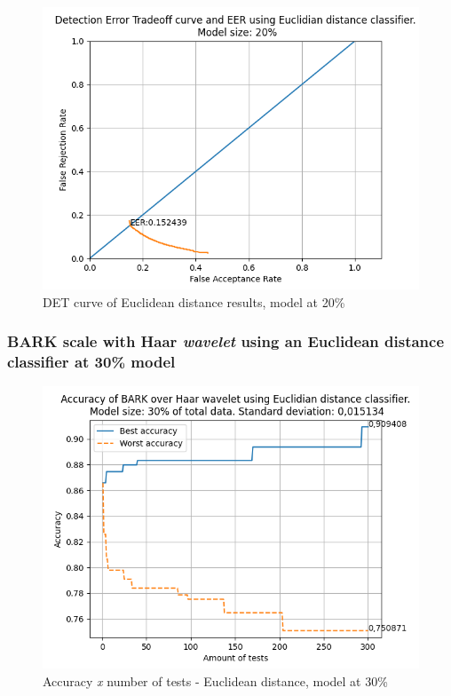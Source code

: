 			\begin{figure}[H]
				\centering
				\includegraphics[scale=.6]{images/results/det/DET_for_classifier_Euclidian_20}
				\caption{DET curve of Euclidean distance results, model at 20\%}
				\label{fig:detforclassifiereuclidian20}
			\end{figure}

			
		
		\subsubsection{BARK scale with Haar \textit{wavelet} using an Euclidean distance classifier at 30\% model}
				
			\begin{figure}[ht]
				\centering
				\includegraphics[scale=.6]{images/results/confusionMatrices/classifier_Euclidian_30}
				\caption{Accuracy \textit{x} number of tests - Euclidean distance, model at 30\%}
				\label{fig:classifiereuclidian30}
			\end{figure}
			
